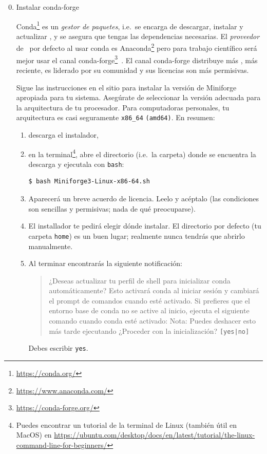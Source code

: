 \begin{enumerate}
  \setcounter{enumi}{-1}
  \item Instalar conda-forge

  Conda\footnote{
    \url{https://conda.org/}
  } es un \emph{gestor de paquetes}, i.e.\ se encarga de descargar, instalar y actualizar
  \software, y se asegura que tengas las dependencias necesarias. El \emph{proveedor} de
  \software\ por defecto al usar conda es Anaconda\footnote{
    \url{https://www.anaconda.com/}
    } pero para trabajo científico será mejor usar el canal conda-forge\footnote{
      \url{https://conda-forge.org/}
    }~\autocite{condaforge}. El canal conda-forge distribuye más \software, más reciente,
    es liderado por su comunidad y sus licencias son más permisivas.

    Sigue las instrucciones en el sitio para instalar la versión de Miniforge apropiada
    para tu sistema. Asegúrate de seleccionar la versión adecuada para la arquitectura de
    tu procesador. Para computadoras personales, tu arquitectura es casi seguramente
    \texttt{x86\_64} \texttt{(amd64)}. En resumen:
    \begin{enumerate}
      \item descarga el instalador,

      \item en la terminal\footnote{
        Puedes encontrar un tutorial de la terminal de Linux (también útil en MacOS)
        en
        \url{https://ubuntu.com/desktop/docs/en/latest/tutorial/the-linux-command-line-for-beginners/}
      }, abre el directorio (i.e.\ la carpeta) donde se encuentra la descarga
      y ejecutala con \texttt{bash}:
      \begin{verbatim}
$ bash Miniforge3-Linux-x86-64.sh
      \end{verbatim}

      \item Aparecerá un breve acuerdo de licencia. Leelo y acéptalo (las condiciones son
      sencillas y permisivas; nada de qué preocuparse).

      \item El installador te pedirá elegir dónde instalar. El directorio por defecto
      (tu carpeta \texttt{home}) es un buen lugar; realmente nunca tendrás que abrirlo
      manualmente.

      \item Al terminar encontrarás la siguiente notificación:
      \blockquote{
        ¿Deseas actualizar tu perfil de shell para inicializar conda automáticamente?
        Esto activará conda al iniciar sesión y cambiará el prompt de comandos cuando esté activado.
        Si prefieres que el entorno base de conda no se active al inicio,
        ejecuta el siguiente comando cuando conda esté activado:
        Nota: Puedes deshacer esto más tarde ejecutando 
        ¿Proceder con la inicialización? \texttt{[yes|no]}
      }
      Debes escribir \texttt{yes}.


\end{enumerate}
\end{enumerate}
